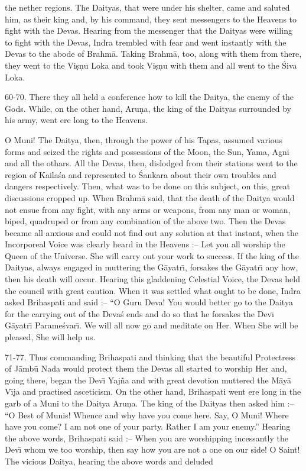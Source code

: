 the nether regions. The Daityas, that were under his shelter, came and saluted him, as their king and, by his command, they sent messengers to the Heavens to fight with the Devas. Hearing from the messenger that the Daityas were willing to fight with the Devas, Indra trembled with fear and went instantly with the Devas to the abode of Brahm\=a. Taking Brahm\=a, too, along with them from there, they went to the Vi\d{s}\d{n}u Loka and took Vi\d{s}\d{n}u with them and all went to the \'Siva Loka.

60-70. There they all held a conference how to kill the Daitya, the enemy of the Gods. While, on the other hand, Aru\d{n}a, the king of the Daityas surrounded by his army, went ere long to the Heavens.

O Muni! The Daitya, then, through the power of his Tapas, assumed various forms and seized the rights and possessions of the Moon, the Sun, Yama, Agni and all the othars. All the Devas, then, dislodged from their stations went to the region of Kaila\'sa and represented to \'Sankara about their own troubles and dangers respectively. Then, what was to be done on this subject, on this, great discussions cropped up. When Brahm\=a said, that the death of the Daitya would not ensue from any fight, with any arms or weapons, from any man or woman, biped, quadruped or from any combination of the above two. Then the Devas became all anxious and could not find out any solution at that instant, when the Incorporeal Voice was clearly heard in the Heavens :-- Let you all worship the Queen of the Universe. She will carry out your work to success. If the king of the Daityas, always engaged in muttering the G\=ayatr\={\i}, forsakes the G\=ayatr\={\i} any how, then his death will occur. Hearing this gladdening Celestial Voice, the Devas held the council with great caution. When it was settled what ought to be done, Indra asked Brihaspati and said :-- ``O Guru Deva! You would better go to the Daitya for the carrying out of the Deva\'s ends and do so that he forsakes the Dev\={\i} G\=ayatr\={\i} Parame\'svar\={\i}. We will all now go and meditate on Her. When She will be pleased, She will help us.

71-77. Thus commanding Brihaspati and thinking that the beautiful Protectress of J\=amb\=u Nada would protect them the Devas all started to worship Her and, going there, began the Dev\={\i} Yaj\~na and with great devotion muttered the M\=ay\=a V\={\i}ja and practised asceticism. On the other hand, Brihaspati went ere long in the garb of a Muni to the Daitya Aru\d{n}a. The king of the Daityas then asked him :-- ``O Best of Munis! Whence and why have you come here. Say, O Muni! Where have you come? I am not one of your party. Rather I am your enemy.'' Hearing the above words, Brihaspati said :-- When you are worshipping incessantly the Dev\={\i} whom we too worship, then say how you are not a one on our side! O Saint! The vicious Daitya, hearing the above words and deluded

